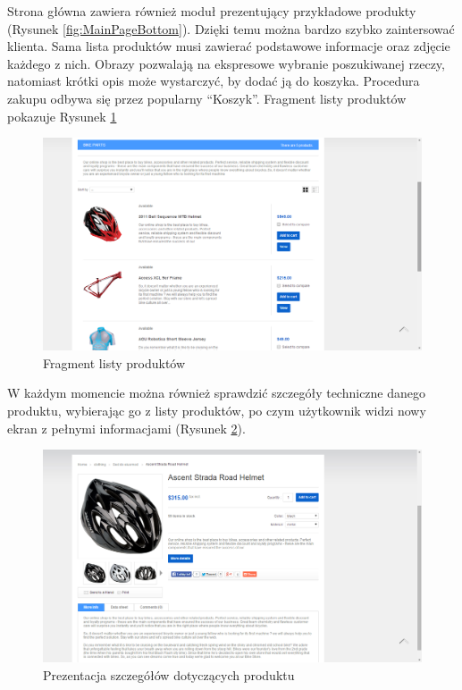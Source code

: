 Strona główna zawiera również moduł prezentujący przykładowe produkty (Rysunek
\ref{fig:MainPageBottom}). Dzięki temu można bardzo szybko zaintersować klienta.
Sama lista produktów musi zawierać podstawowe informacje oraz zdjęcie każdego z
nich. Obrazy pozwalają na ekspresowe wybranie poszukiwanej rzeczy, natomiast
krótki opis może wystarczyć, by dodać ją do koszyka. Procedura zakupu odbywa się
przez popularny ``Koszyk''. Fragment listy produktów pokazuje Rysunek
\ref{fig:ProductList} \\

\begin{figure}[h!]
  \centering
    \includegraphics[width=\textwidth]{graphics/ui/Products.png}
  \caption{Fragment listy produktów}
  \label{fig:ProductList}
\end{figure}

W każdym momencie można również sprawdzić szczegóły techniczne danego produktu,
wybierając go z listy produktów, po czym użytkownik widzi nowy ekran z pełnymi
informacjami (Rysunek \ref{fig:ProductPresentation}).

\begin{figure}[h!]
  \centering
    \includegraphics[width=\textwidth]{graphics/ui/ProductPresentation.png}
  \caption{Prezentacja szczegółów dotyczących produktu}
  \label{fig:ProductPresentation}
\end{figure}

